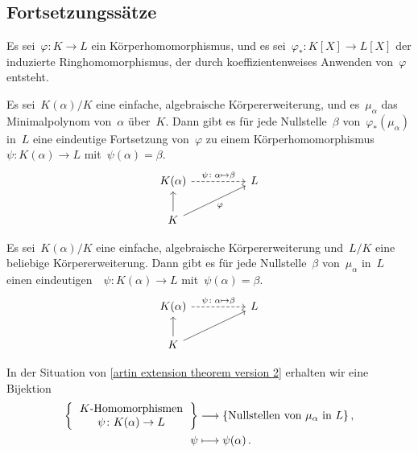 \subsection{Fortsetzungssätze}

\begin{theorem}
  Es sei~$\varphi \colon K \to L$ ein Körperhomomorphismus, und es sei~$\varphi_* \colon K[X] \to L[X]$ der induzierte Ringhomomorphismus, der durch koeffizientenweises Anwenden von~$\varphi$ entsteht.

  Es sei~$K(\alpha)/K$ eine einfache, algebraische Körpererweiterung, und es~$\mu_\alpha$ das Minimalpolynom von~$\alpha$ über~$K$.
  Dann gibt es für jede Nullstelle~$\beta$ von~$\varphi_*(\mu_\alpha)$ in~$L$ eine eindeutige Fortsetzung von~$\varphi$ zu einem Körperhomomorphismus~$\psi \colon K(\alpha) \to L$ mit~$\psi(\alpha) = \beta$.
  \[
    \begin{tikzcd}[column sep = huge]
      K(\alpha)
      \arrow[dashed]{r}[above]{\psi \colon \alpha \mapsto \beta}
      &
      L
      \\
      K
      \arrow{u}
      \arrow{ur}[below right]{\varphi}
      &
      {}
    \end{tikzcd}
  \]
\end{theorem}

\begin{corollary}
  \label{artin extension theorem version 2}
  Es sei~$K(\alpha)/K$ eine einfache, algebraische Körpererweiterung und~$L/K$ eine beliebige Körpererweiterung.
  Dann gibt es für jede Nullstelle~$\beta$ von~$\mu_\alpha$ in~$L$ einen eindeutigen~~$\psi \colon K(\alpha) \to L$ mit~$\psi(\alpha) = \beta$.
  \[
    \begin{tikzcd}[column sep = huge]
      K(\alpha)
      \arrow[dashed]{r}[above]{\psi \colon \alpha \mapsto \beta}
      &
      L
      \\
      K
      \arrow{u}
      \arrow{ur}
      &
      {}
    \end{tikzcd}
  \]
\end{corollary}

\begin{corollary}
  \label{galois existence}
  In der Situation von \cref{artin extension theorem version 2} erhalten wir eine Bijektion
  \begin{align*}
    \left\{
      \begin{tabular}{c}
        \Homomorphismen{$K$}\\
        $\psi \colon K(\alpha) \to L$
      \end{tabular}
    \right\}
    &\to
    \{
      \text{Nullstellen von~$\mu_\alpha$ in~$L$}
    \} \,,
    \\
    \psi
    &\mapsto
    \psi(\alpha) \,.
  \end{align*}
\end{corollary}

